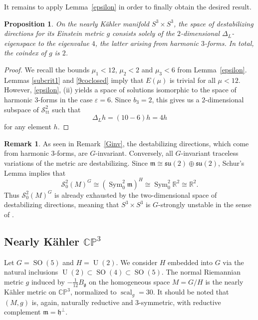 \documentclass[12pt]{scrartcl}
\theoremstyle{plain}
\newtheorem{prop}[satz]{Proposition}
\theoremstyle{definition}
\newtheorem{bem}[satz]{Remark}
\newcommand{\R}{\mathbb{R}}%
\newcommand{\CP}{\mathbb{CP}}%
\newcommand{\scal}{\operatorname{scal}}%
\newcommand{\Sym}{\operatorname{Sym}}%
\renewcommand{\S}{\mathscr{S}}%
\newcommand{\U}{\operatorname{U}}%
\newcommand{\su}{\mathfrak{su}}%
\newcommand{\SO}{\operatorname{SO}}%
\newcommand{\m}{\mathfrak{m}}%
\newcommand{\h}{\mathfrak{h}}%
\newcommand{\g}{\mathfrak{g}}%
\newcommand{\TT}{\S^2_{\mathrm{tt}}}%
\begin{document}
\noindent
It remains to apply Lemma~\ref{epsilon} in order to finally obtain the desired result.

\begin{prop}\label{s3xs3prop}
  On the nearly Kähler manifold $S^3\times S^3$, the space of destabilizing directions for its Einstein metric $g$ consists solely of the $2$-dimensional $\Delta_L$-eigenspace to the eigenvalue $4$, the latter arising from harmonic $3$-forms. In total, the coindex of $g$ is $2$.
\end{prop}
\begin{proof}
We recall the bounds $\mu_1<12$, $\mu_2<2$ and $\mu_3<6$ from Lemma~\ref{epsilon}. Lemmas \ref{subcrit1} and \ref{9coclosed} imply that $E(\mu)$ is trivial for all $\mu<12$. However, \ref{epsilon}, (ii) yields a space of solutions isomorphic to the space of harmonic $3$-forms in the case $\varepsilon=6$. Since $b_3=2$, this gives us a $2$-dimensional subspace of $\TT$ such that
\[\Delta_Lh=(10-6)h=4h\]
for any element $h$.
\end{proof}

\begin{bem}\label{s3xs3Gstr}
As seen in Remark~\ref{Ginv}, the destabilizing directions, which come from harmonic $3$-forms, are $G$-invariant. Conversely, all $G$-invariant traceless variations of the metric are destabilizing. Since $\m\cong\su(2)\oplus\su(2)$, Schur's Lemma implies that
\[\S^2_0(M)^G\cong(\Sym^2_0\m)^H\cong\Sym^2_0\R^2\cong\R^2.\]
Thus $\S^2_0(M)^G$ is already exhausted by the two-dimensional space of destabilizing directions, meaning that $S^3\times S^3$ is $G$-strongly unstable in the sense of \cite{ejlauret}.
\end{bem}


\subsection{Nearly Kähler $\CP^3$}
\label{sec:cp3}

Let $G=\SO(5)$ and $H=\U(2)$. We consider $H$ embedded into $G$ via the natural inclusions $\U(2)\subset\SO(4)\subset\SO(5)$. The normal Riemannian metric $g$ induced by $-\frac{1}{12}B_{\g}$ on the homogeneous space $M=G/H$ is the nearly Kähler metric on $\CP^3$, normalized to $\scal_g=30$. It should be noted that $(M,g)$ is, again, naturally reductive and 3-symmetric, with reductive complement $\m=\h^\perp$.
\end{document}
